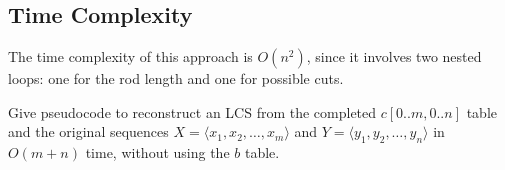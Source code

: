 \documentclass[10pt,letter,notitlepage]{article}
\newcounter{exercise}
\begin{document}
\begin{Answer}[]
\subsection*{Time Complexity}
The time complexity of this approach is $O(n^2)$, since it involves two nested loops: one for the rod length and one for possible cuts.



\end{Answer}

\begin{exercise}[(15 marks)]
Give pseudocode to reconstruct an LCS from the completed $c[0..m, 0..n]$ table and the original sequences $X = \langle x_1, x_2, \dots, x_m \rangle$ and $Y = \langle y_1, y_2, \dots, y_n \rangle$ in $O(m + n)$ time, without using the $b$ table.
\end{exercise}
\end{document}
